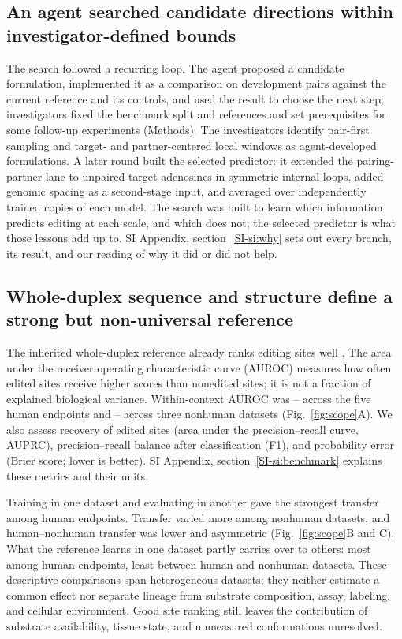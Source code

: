 \documentclass[9pt,twocolumn,twoside]{pnas-new}
\newcommand{\SIref}[1]{\ref*{SI-#1}}
\begin{document}
\subsection*{An agent searched candidate directions within investigator-defined bounds}

The search followed a recurring loop. The agent proposed a candidate formulation, implemented it as a comparison on development pairs against the current reference and its controls, and used the result to choose the next step; investigators fixed the benchmark split and references and set prerequisites for some follow-up experiments (Methods). The investigators identify pair-first sampling and target- and partner-centered local windows as agent-developed formulations. A later round built the selected predictor: it extended the pairing-partner lane to unpaired target adenosines in symmetric internal loops, added genomic spacing as a second-stage input, and averaged over independently trained copies of each model. The search was built to learn which information predicts editing at each scale, and which does not; the selected predictor is what those lessons add up to. SI Appendix, section~\SIref{si:why} sets out every branch, its result, and our reading of why it did or did not help.

\subsection*{Whole-duplex sequence and structure define a strong but non-universal reference}

The inherited whole-duplex reference already ranks editing sites well \cite{Rosenwasser2026AdarEdit}. The area under the receiver operating characteristic curve (AUROC) measures how often edited sites receive higher scores than nonedited sites; it is not a fraction of explained biological variance. Within-context AUROC was \ReferenceHumanWithinAUROCMin{}--\ReferenceHumanWithinAUROCMax{} across the five human endpoints and \ReferenceNonhumanWithinAUROCMin{}--\ReferenceNonhumanWithinAUROCMax{} across three nonhuman datasets (Fig.~\ref{fig:scope}A). We also assess recovery of edited sites (area under the precision--recall curve, AUPRC), precision--recall balance after classification (F1), and probability error (Brier score; lower is better). SI Appendix, section~\SIref{si:benchmark} explains these metrics and their units.

Training in one dataset and evaluating in another gave the strongest transfer among human endpoints. Transfer varied more among nonhuman datasets, and human--nonhuman transfer was lower and asymmetric (Fig.~\ref{fig:scope}B and C). What the reference learns in one dataset partly carries over to others: most among human endpoints, least between human and nonhuman datasets. These descriptive comparisons span heterogeneous datasets; they neither estimate a common effect nor separate lineage from substrate composition, assay, labeling, and cellular environment. Good site ranking still leaves the contribution of substrate availability, tissue state, and unmeasured conformations unresolved.
\end{document}
